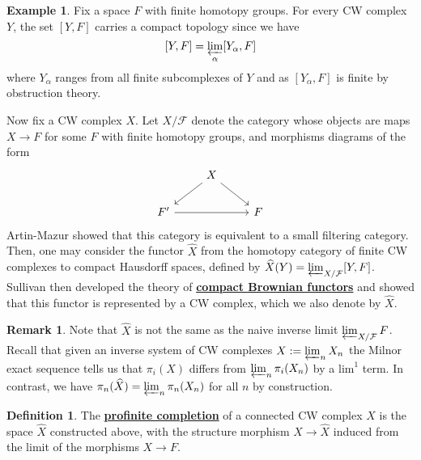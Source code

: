 \documentclass{article}
\theoremstyle{definition}
\theoremstyle{definition}
\newtheorem{definition}{Definition}[theorem]
\theoremstyle{definition}
\newtheorem{remark}{Remark}[theorem]
\theoremstyle{definition}
\theoremstyle{definition}
\theoremstyle{definition}
\theoremstyle{definition}
\newtheorem{example}{Example}[theorem]
\begin{document}
\begin{tcolorbox}[colback=yellow!5!white,colframe=yellow!30!white]
\begin{example}
Fix a space $F$ with finite homotopy groups. For every CW complex $Y$, the set $[Y,F]$ carries a compact topology since we have 
\[[Y,F]=\varprojlim_{\alpha}[Y_{\alpha}, F]\]
where $Y_{\alpha}$ ranges from all finite subcomplexes of $Y$ and as $[Y_{\alpha}, F]$ is finite by obstruction theory.
\end{example}
\end{tcolorbox}
Now fix a CW complex $X$. Let $X/\mathcal{F}$ denote the category whose objects are maps $X\to F$ for some $F$ with finite homotopy groups, and morphisms diagrams of the form 
\[\begin{tikzcd}
	& X \\
	{F'} && F
	\arrow[from=1-2, to=2-1]
	\arrow[from=1-2, to=2-3]
	\arrow[from=2-1, to=2-3]
\end{tikzcd}\]
Artin-Mazur showed that this category is equivalent to a small filtering category. Then, one may consider the functor $\widehat{X}$ from the homotopy category of finite CW complexes to compact Hausdorff spaces, defined by $\widehat{X}(Y)=\varprojlim_{X/\mathcal{F}}[Y,F]$. Sullivan then developed the theory of \underline{\textbf{compact Brownian functors}} and showed that this functor is represented by a CW complex, which we also denote by $\widehat{X}$. 


\begin{tcolorbox}[colback=green!5!white,colframe=green!30!white]
\begin{remark}
Note that $\widehat{X}$ is not the same as the naive inverse limit $\varprojlim_{X/\mathcal{F}}F$. Recall that given an inverse system of CW complexes $X:=\varprojlim_n X_n$ the Milnor exact sequence tells us that $\pi_i(X)$ differs from $\varprojlim_n \pi_i(X_n)$ by a $\textrm{lim}^1$ term. In contrast, we have $\pi_n(\widehat{X})=\varprojlim_n \pi_n(X_n)$ for all $n$ by construction.
\end{remark}
\end{tcolorbox}




\begin{tcolorbox}[colback=purple!5!white,colframe=purple!75!black]
\begin{definition}
The \underline{\textbf{profinite completion}} of a connected CW complex $X$ is the space $\widehat{X}$ constructed above, with the structure morphism $X\to \widehat{X}$ induced from the limit of the morphisms $X\to F$.
\end{definition}
\end{tcolorbox}
\end{document}
